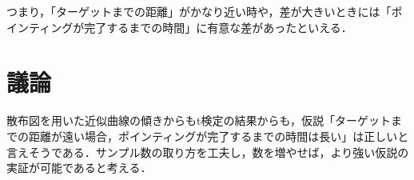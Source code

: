 \documentclass[a4paper, papersize, titlepage]{jsarticle}
\begin{document}
\begin{multicols}{2}
つまり，「ターゲットまでの距離」がかなり近い時や，差が大きいときには「ポインティングが完了するまでの時間」に有意な差があったといえる．



\section{議論}
散布図を用いた近似曲線の傾きからもt検定の結果からも，仮説「ターゲットまでの距離が遠い場合，ポインティングが完了するまでの時間は長い」は正しいと言えそうである．サンプル数の取り方を工夫し，数を増やせば，より強い仮説の実証が可能であると考える．

\end{multicols}
\end{document}
